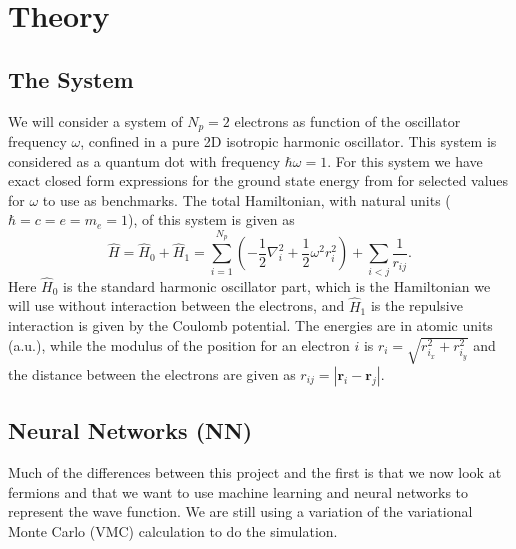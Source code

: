 \documentclass[12pt,a4paper,english]{article}
\begin{document}
\section{Theory}
\label{sect:Theory}
\subsection{The System}
\label{subsect:System}
We will consider a system of $N_p=2$ electrons as function of the oscillator frequency $\omega$, confined in a pure 2D isotropic harmonic oscillator. This system is considered as a quantum dot with frequency $\hbar\omega=1$. For this system we have exact closed form expressions for the ground state energy from \citet{taut1993two} for selected values for $\omega$ to use as benchmarks. The total Hamiltonian, with natural units ($\hbar=c=e=m_e=1$), of this system is given as 
\begin{equation}
\label{eq:Hamlitonian}
\hat{H}=\hat{H}_0+\hat{H}_1=\sum_{i=1}^{N_p}\left(-\frac{1}{2}\nabla^2_i + \frac{1}{2}\omega^2r_i^2\right) + \sum_{i<j}\frac{1}{r_{ij}}.
\end{equation}
Here $\hat{H}_0$ is the standard harmonic oscillator part, which is the Hamiltonian we will use without interaction between the electrons, and $\hat{H}_1$ is the repulsive interaction is given by the Coulomb potential. The energies are in atomic units (a.u.), while the modulus of the position for an electron $i$ is $r_i=\sqrt{r^2_{i_x}+r^2_{i_y}}$ and the distance between the electrons are given as $r_{ij}=|\textbf{r}_i-\textbf{r}_j|$.

\subsection{Neural Networks (NN)}
\label{subsect:NN}
Much of the differences between this project and the first is that we now look at fermions and that we want to use machine learning and neural networks to represent the wave function. We are still using a variation of the variational Monte Carlo (VMC) calculation to do the simulation.
\end{document}
